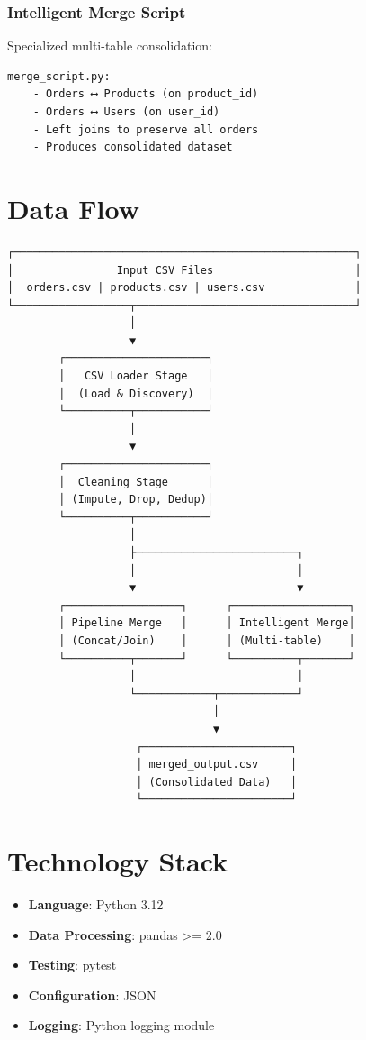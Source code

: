 \documentclass[12pt,a4paper]{report}
\begin{document}
\subsubsection{Intelligent Merge Script}
Specialized multi-table consolidation:
\begin{lstlisting}
merge_script.py:
    - Orders ⟷ Products (on product_id)
    - Orders ⟷ Users (on user_id)
    - Left joins to preserve all orders
    - Produces consolidated dataset
\end{lstlisting}

\section{Data Flow}

\begin{verbatim}
┌─────────────────────────────────────────────────────┐
│                Input CSV Files                      │
│  orders.csv | products.csv | users.csv              │
└──────────────────┬──────────────────────────────────┘
                   │
                   ▼
        ┌──────────────────────┐
        │   CSV Loader Stage   │
        │  (Load & Discovery)  │
        └──────────┬───────────┘
                   │
                   ▼
        ┌──────────────────────┐
        │  Cleaning Stage      │
        │ (Impute, Drop, Dedup)│
        └──────────┬───────────┘
                   │
                   ├─────────────────────────┐
                   │                         │
                   ▼                         ▼
        ┌──────────────────┐      ┌──────────────────┐
        │ Pipeline Merge   │      │ Intelligent Merge│
        │ (Concat/Join)    │      │ (Multi-table)    │
        └──────────┬───────┘      └──────────┬───────┘
                   │                         │
                   └────────────┬────────────┘
                                │
                                ▼
                    ┌───────────────────────┐
                    │ merged_output.csv     │
                    │ (Consolidated Data)   │
                    └───────────────────────┘
\end{verbatim}

\section{Technology Stack}

\begin{itemize}
    \item \textbf{Language}: Python 3.12
    \item \textbf{Data Processing}: pandas >= 2.0
    \item \textbf{Testing}: pytest
    \item \textbf{Configuration}: JSON
    \item \textbf{Logging}: Python logging module
\end{itemize}
\end{document}
